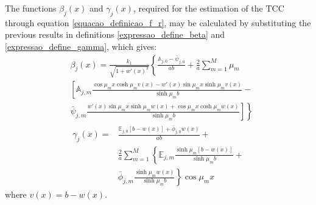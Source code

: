 \documentclass[conference,compsoc,fleqn]{IEEEtran}
\begin{document}
The functions $\beta_j(x)$ and $\gamma_j(x)$, required for the estimation of the TCC through equation \eqref{equacao_definicao_f_r}, may be calculated by substituting the previous results in definitions \eqref{expressao_define_beta} and \eqref{expressao_define_gamma}, which gives:
\begin{align}
& \beta_j(x) = \frac{k_1}{\sqrt{1 + w'(x)^2}}\left\lbrace \frac{\mathbb{A}_{j,0} - \bar{\psi}_{j,0}}{ab} +
\frac{2}{a}\sum_{m=1}^M \mu_m \right. \nonumber \\
& \left[ \mathbb{A}_{j,m}\frac{\scriptstyle\cos\mu_m x\cosh\mu_m v(x) - w'(x)\sin\mu_m x\sinh\mu_m v(x)}{\scriptstyle\sinh\mu_m b} \right. - \nonumber \\
&\left. \left. \bar{\psi}_{j, m}\frac{\scriptstyle w'(x)\sin\mu_m x\sinh\mu_m w(x) + \cos\mu_m x\cosh\mu_m w(x)}{\scriptstyle\sinh\mu_m b}\right] \right\rbrace
\label{serie_para_beta}
\end{align}
\begin{align}
\gamma_j(x) = & \frac{\mathbb{E}_{j,0}[b - w(x)] + \bar{\phi}_{j,0}w(x)}{ab} + \nonumber \\
& \frac{2}{a}\sum_{m=1}^M \left\lbrace\mathbb{E}_{j,m}\frac{\sinh\mu_m [b - w(x)]}{\sinh\mu_m b} + \right. \nonumber \\
& \left. \bar{\phi}_{j, m}\frac{\sinh\mu_m w(x)}{\sinh\mu_m b}\right\rbrace \cos\mu_m x
\label{serie_para_gamma}
\end{align} 
where $v(x) = b - w(x)$.
\\

\end{document}
